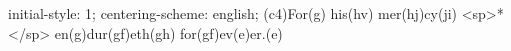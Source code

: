 initial-style: 1;
centering-scheme: english;
(c4)For(g) his(hv) mer(hj)cy(ji) <sp>*</sp> en(g)dur(gf)eth(gh) for(gf)ev(e)er.(e)
